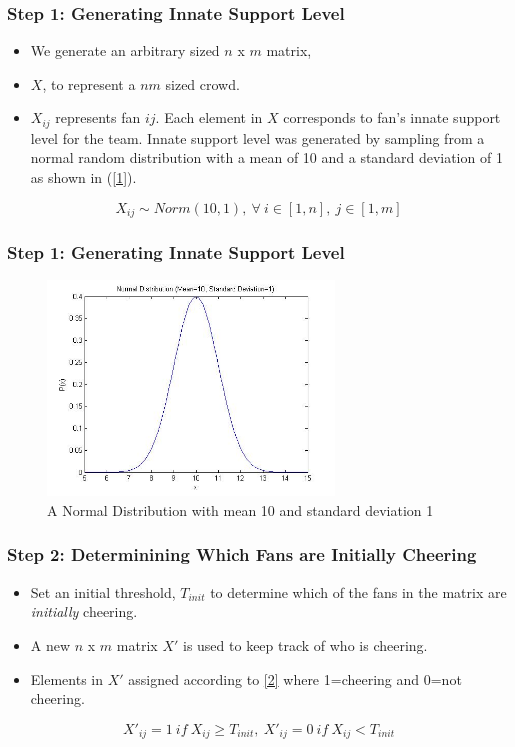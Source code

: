 \documentclass[compress,handout,10pt]{beamer}
\let\olditem\item
\renewcommand{\item}{\setlength{\itemsep}{0.5\baselineskip}\olditem}
\begin{document}
\begin{frame}
\frametitle{Step 1: Generating Innate Support Level}
\begin{itemize}
\item We generate an arbitrary sized $n$ x $m$ matrix,
\item  $X$, to represent a $nm$ sized crowd.
\item   $X_{ij}$ represents fan $ij$. Each element in $X$ corresponds to fan's innate support level for the team.
Innate support level was generated by sampling from a normal random distribution with a mean of 10 and a standard deviation of 1 as shown in (\ref{1}).
\end{itemize} 
\begin{equation}
X_{ij}\sim Norm(10,1),~\forall~i\in[1,n],~j\in[1,m]
\label{1}
\end{equation}
\end{frame}

\begin{frame}
	\frametitle{Step 1: Generating Innate Support Level}
	\begin{figure}
		\begin{center}
		\includegraphics[width=3in] {NormDistribution.jpg}
		\end{center}
		\caption{A Normal Distribution with mean 10 and standard deviation 1}
		\label{fig:normdistribution}
	\end{figure}
\end{frame}

\begin{frame}
\frametitle{Step 2: Determinining Which Fans are Initially Cheering}
\begin{itemize}
\item Set an initial threshold, $T_{init}$ to determine which of the fans in the matrix are \textit{initially} cheering. 
\item A new $n$ x $m$ matrix $X'$ is used to keep track of who is cheering. 
\item Elements in $X'$ assigned according to \eqref{2} where 1=cheering and 0=not cheering.
\end{itemize}
\begin{equation}
X'_{ij}=1~if~X_{ij}\geq T_{init},~X'_{ij}=0~if~X_{ij}<T_{init}
\label{2}
\end{equation}
\end{frame}
\end{document}
